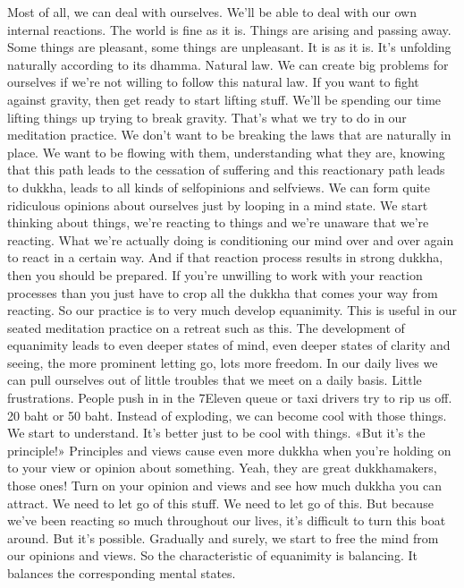 \documentclass[letterpaper,10pt,english]{sphinxmanual}
\begin{document}
\sphinxAtStartPar
Most of all, we can deal with ourselves. We’ll be able to deal with our
own internal reactions. The world is fine as it is. Things are arising and passing away. Some things are pleasant, some things are unpleasant. It is as it is.
It’s unfolding naturally according to its dhamma. Natural law. We can create
big problems for ourselves if we’re not willing to follow this natural law. If
you want to fight against gravity, then get ready to start lifting stuff. We’ll be
spending our time lifting things up trying to break gravity. That’s what we
try to do in our meditation practice. We don’t want to be breaking the laws
that are naturally in place. We want to be flowing with them, understanding
what they are, knowing that this path leads to the cessation of suffering and
this reactionary path leads to dukkha, leads to all kinds of self\sphinxhyphen{}opinions and
self\sphinxhyphen{}views. We  can  form  quite  ridiculous  opinions  about  ourselves  just  by
looping  in  a  mind  state.
We start thinking about
things, we’re reacting to things and we’re unaware that we’re reacting. What
we’re actually doing is conditioning our mind over and over again to react in
a certain way. And if that reaction process results in strong dukkha, then you
should be prepared. If you’re unwilling to work with your reaction processes
  than you just have to crop all the dukkha that comes your way from reacting.
So our practice is to very much develop equanimity. This is useful in
our seated meditation practice on a retreat such as this. The development of
equanimity leads to even deeper states of mind, even deeper states of clarity
and seeing, the more prominent letting go, lots more freedom. In our daily
lives  we  can  pull  ourselves  out  of  little  troubles  that  we  meet  on  a  daily
basis. Little frustrations. People push in in the 7Eleven queue or taxi drivers
try to rip us off. 20 baht or 50 baht. Instead of exploding, we can become
cool  with  those  things.  We  start  to  understand.  It’s  better  just  to  be  cool
with things. «But it’s the principle!» Principles and views cause even more
dukkha when you’re holding on to your view or opinion about something.
Yeah, they are great dukkha\sphinxhyphen{}makers, those ones! Turn on your opinion and
views and see how much dukkha you can attract. We need to let go of this
stuff. We need to let go of this. But because we’ve been reacting so much
throughout our lives, it’s difficult to turn this boat around. But it’s possible.
Gradually and surely, we start to free the mind from our opinions and views.
So  the  characteristic  of  equanimity  is  balancing.  It  balances  the  corresponding mental states.
\end{document}
